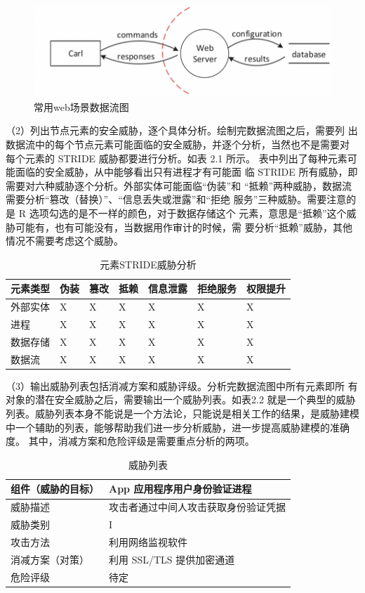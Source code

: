 \begin{figure}
    \centering
    \includegraphics[scale=0.6]{resources/img/i7.png}
    \caption{常用web场景数据流图}
  \end{figure}
  （2）列出节点元素的安全威胁，逐个具体分析。绘制完数据流图之后，需要列
  出数据流中的每个节点元素可能面临的安全威胁，并逐个分析，当然也不是需要对
  每个元素的 STRIDE 威胁都要进行分析。如表 2.1 所示。
  表中列出了每种元素可能面临的安全威胁，从中能够看出只有进程才有可能面
  临 STRIDE 所有威胁，即需要对六种威胁逐个分析。外部实体可能面临“伪装”和
  “抵赖”两种威胁，数据流需要分析“篡改（替换）”、“信息丢失或泄露”和“拒绝
  服务”三种威胁。需要注意的是 R 选项勾选的是不一样的颜色，对于数据存储这个
  元素，意思是“抵赖”这个威胁可能有，也有可能没有，当数据用作审计的时候，需
  要分析“抵赖”威胁，其他情况不需要考虑这个威胁。
  \begin{table}
    \caption{元素STRIDE威胁分析}
  \begin{center}
    \begin{tabular}{|l|l|l|l|l|l|l}
      \hline 元素类型 & 伪装 & 篡改 & 抵赖 & 信息泄露 & 拒绝服务 & 权限提升\\
      \hline 外部实体 & X & X & X & X & X & X \\
      \hline 进程 & X & X & X & X & X & X \\
      \hline 数据存储 & X & X & X & X & X & X \\
      \hline 数据流 & X & X & X & X & X & X \\
      \hline
      \end{tabular}
  \end{center}
\end{table}
  （3）输出威胁列表包括消减方案和威胁评级。分析完数据流图中所有元素即所
有对象的潜在安全威胁之后，需要输出一个威胁列表。如表2.2 就是一个典型的威胁
列表。威胁列表本身不能说是一个方法论，只能说是相关工作的结果，是威胁建模
中一个辅助的列表，能够帮助我们进一步分析威胁，进一步提高威胁建模的准确度。
其中，消减方案和危险评级是需要重点分析的两项。
\begin{table}
  \caption{威胁列表}
\begin{center}
  \begin{tabular}{|l|l|}
    \hline 组件（威胁的目标） & App 应用程序用户身份验证进程 \\
    \hline 威胁描述 & 攻击者通过中间人攻击获取身份验证凭据 \\
    \hline 威胁类别 & I \\
    \hline 攻击方法 & 利用网络监视软件 \\
    \hline 消减方案（对策） & 利用 SSL/TLS 提供加密通道 \\
    \hline 危险评级 & 待定 \\
    \hline
    \end{tabular}
\end{center}
\end{table}
